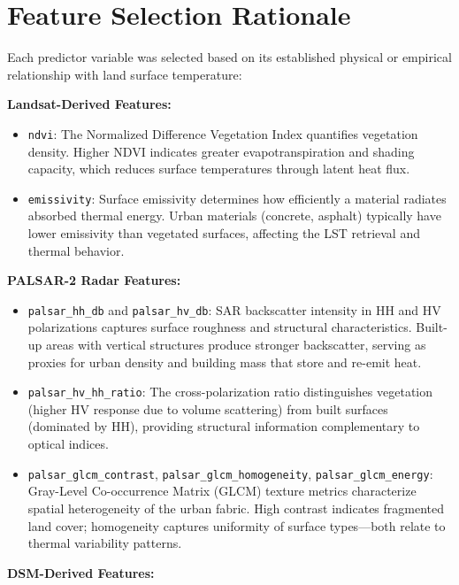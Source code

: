 \documentclass[
]{report}
\begin{document}
\section{Feature Selection Rationale}\label{feature-selection-rationale}

Each predictor variable was selected based on its established physical
or empirical relationship with land surface temperature:

\textbf{Landsat-Derived Features:}

\begin{itemize}
\item
  \texttt{ndvi}: The Normalized Difference Vegetation Index quantifies
  vegetation density. Higher NDVI indicates greater evapotranspiration
  and shading capacity, which reduces surface temperatures through
  latent heat flux.
\item
  \texttt{emissivity}: Surface emissivity determines how efficiently a
  material radiates absorbed thermal energy. Urban materials (concrete,
  asphalt) typically have lower emissivity than vegetated surfaces,
  affecting the LST retrieval and thermal behavior.
\end{itemize}

\textbf{PALSAR-2 Radar Features:}

\begin{itemize}
\item
  \texttt{palsar\_hh\_db} and \texttt{palsar\_hv\_db}: SAR backscatter
  intensity in HH and HV polarizations captures surface roughness and
  structural characteristics. Built-up areas with vertical structures
  produce stronger backscatter, serving as proxies for urban density and
  building mass that store and re-emit heat.
\item
  \texttt{palsar\_hv\_hh\_ratio}: The cross-polarization ratio
  distinguishes vegetation (higher HV response due to volume scattering)
  from built surfaces (dominated by HH), providing structural
  information complementary to optical indices.
\item
  \texttt{palsar\_glcm\_contrast}, \texttt{palsar\_glcm\_homogeneity},
  \texttt{palsar\_glcm\_energy}: Gray-Level Co-occurrence Matrix (GLCM)
  texture metrics characterize spatial heterogeneity of the urban
  fabric. High contrast indicates fragmented land cover; homogeneity
  captures uniformity of surface types---both relate to thermal
  variability patterns.
\end{itemize}

\textbf{DSM-Derived Features:}
\end{document}
